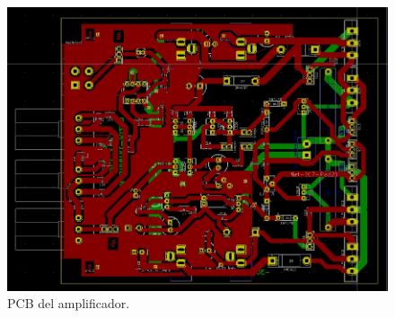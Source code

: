 \begin{figure}[H]
        \centering
        \includegraphics[width=0.65 \textwidth]{img/circuito/PCB1.jpeg}
        \caption{PCB del amplificador.}
        \label{fig::amp_PCB1}
\end{figure}


